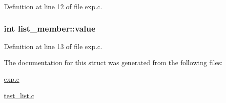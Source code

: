 Definition at line 12 of file exp.\+c.

\subsubsection[{\texorpdfstring{value}{value}}]{\setlength{\rightskip}{0pt plus 5cm}int list\+\_\+member\+::value}\hypertarget{structlist__member_af763bfcc7c384870e4fc4293f85620b3}{}\label{structlist__member_af763bfcc7c384870e4fc4293f85620b3}


Definition at line 13 of file exp.\+c.



The documentation for this struct was generated from the following files\+:\begin{DoxyCompactItemize}
\item 
\hyperlink{exp_8c}{exp.\+c}\item 
\hyperlink{test__list_8c}{test\+\_\+list.\+c}\end{DoxyCompactItemize}
